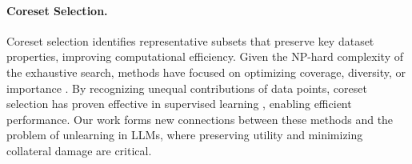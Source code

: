\paragraph{Coreset Selection.} Coreset selection identifies representative subsets that preserve key dataset properties, improving computational efficiency. Given the NP-hard complexity of the exhaustive search, methods have focused on optimizing coverage, diversity, or importance \citep{sener2018active, NEURIPS2023_3abe23bf}. By recognizing unequal contributions of data points, coreset selection has proven effective in supervised learning \citep{wei2015submodularity, killamsetty2021glister, killamsetty2021grad}, enabling efficient performance. 
Our work forms new connections between these methods and the problem of unlearning in LLMs, where preserving utility and minimizing collateral damage are critical.